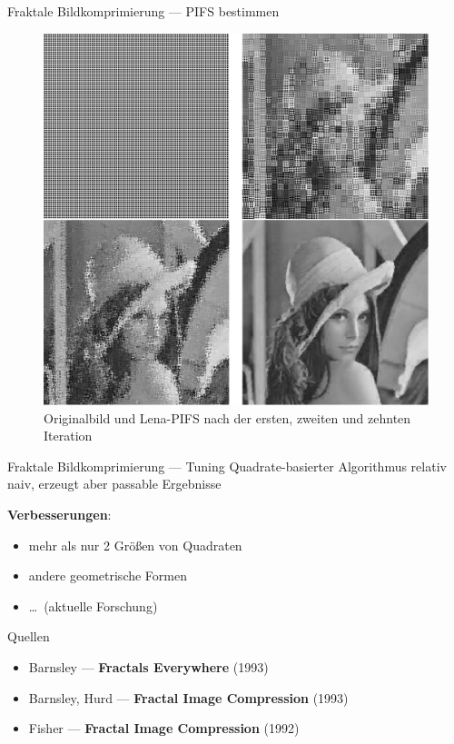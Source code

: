 \documentclass[10pt]{beamer}
\begin{document}
\begin{frame}{Fraktale Bildkomprimierung --- PIFS bestimmen}
  \begin{figure}
    \includegraphics[width=.65\textwidth]{lena-pifs}
    \caption*{\tiny{Originalbild und Lena-PIFS nach der ersten, zweiten und zehnten Iteration}}
  \end{figure}
\end{frame}

\begin{frame}{Fraktale Bildkomprimierung --- Tuning}
  Quadrate-basierter Algorithmus relativ naiv, erzeugt aber passable Ergebnisse

  \textbf{Verbesserungen}:
  \begin{itemize}
    \item mehr als nur 2 Größen von Quadraten
    \item andere geometrische Formen
    \item \dots\  (aktuelle Forschung)
  \end{itemize}
\end{frame}

\begin{frame}[fragile]{Quellen}
  \begin{itemize}
    \item Barnsley --- \textbf{Fractals Everywhere} (1993)
    \item Barnsley, Hurd --- \textbf{Fractal Image Compression} (1993)
    \item Fisher --- \textbf{Fractal Image Compression} (1992)
  \end{itemize}
\end{frame}
\end{document}
